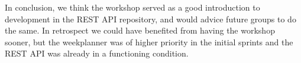 In conclusion, we think the workshop served as a good introduction to development in the REST API repository, and would advice future groups to do the same.
In retrospect we could have benefited from having the workshop sooner, but the weekplanner was of higher priority in the initial sprints and the REST API was already in a functioning condition.

